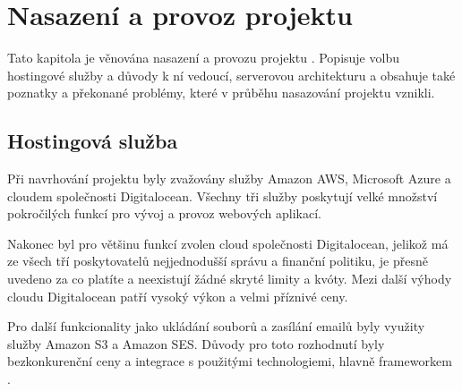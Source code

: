 \section{Nasazení a provoz projektu}
\label{sec:deployment-running}

Tato kapitola je věnována nasazení a provozu projektu \bso. Popisuje volbu hostingové služby a důvody k ní vedoucí, serverovou architekturu a obsahuje také poznatky a překonané problémy, které v průběhu nasazování projektu vznikli.

\subsection{Hostingová služba}
\label{sub:hosting}

Při navrhování projektu \bso byly zvažovány služby Amazon AWS\cite{amazon-aws}, Microsoft Azure\cite{ms-azure} a cloudem společnosti Digitalocean\cite{digitalocean}. Všechny tři služby poskytují velké množství pokročilých funkcí pro vývoj a provoz webových aplikací. 

Nakonec byl pro většinu funkcí zvolen cloud společnosti Digitalocean, jelikož má ze všech tří poskytovatelů nejjednodušší správu a finanční politiku, je přesně uvedeno za co platíte a neexistují žádné skryté limity a kvóty. Mezi další výhody cloudu Digitalocean patří vysoký výkon a velmi příznivé ceny.\cite{digitalocean-advantages}

Pro další funkcionality jako ukládání souborů a zasílání emailů byly využity služby Amazon S3\cite{amazon-s3} a Amazon SES\cite{amazon-ses}. Důvody pro toto rozhodnutí byly bezkonkurenční ceny a integrace s použitými technologiemi, hlavně \gls{framework}em .


